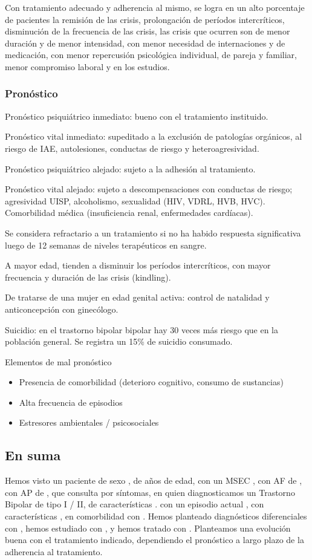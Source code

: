 Con tratamiento adecuado y adherencia al mismo, se logra en un alto porcentaje de pacientes la remisión de las crisis, prolongación de períodos intercríticos, disminución de la frecuencia de las crisis, las crisis que ocurren son de menor duración y de menor intensidad, con menor necesidad de internaciones y de medicación, con menor repercusión psicológica individual, de pareja y familiar, menor compromiso laboral y en los estudios.
\subsubsection*{Pronóstico}
Pronóstico psiquiátrico inmediato: bueno con el tratamiento instituido.

Pronóstico vital inmediato: supeditado a la exclusión de patologías orgánicos, al riesgo de IAE, autolesiones, conductas de riesgo y heteroagresividad.

Pronóstico psiquiátrico alejado: sujeto a la adhesión al tratamiento.

Pronóstico vital alejado: sujeto a descompensaciones con conductas de riesgo; agresividad UISP, alcoholismo, sexualidad (HIV, VDRL, HVB, HVC). Comorbilidad médica (insuficiencia renal, enfermedades cardíacas).

Se considera refractario a un tratamiento si no ha habido respuesta significativa luego de 12 semanas de niveles terapéuticos en sangre.

A mayor edad, tienden a disminuir los períodos intercríticos, con mayor frecuencia y duración de las crisis (kindling).

De tratarse de una mujer en edad genital activa: control de natalidad y anticoncepción con ginecólogo.

Suicidio: en el trastorno bipolar bipolar hay 30 veces más riesgo que en la población general. Se registra un 15\% de suicidio consumado.

Elementos de mal pronóstico
\begin{itemize}
	\item Presencia de comorbilidad (deterioro cognitivo, consumo de sustancias)
	\item Alta frecuencia de episodios
	\item Estresores ambientales / psicosociales
\end{itemize}
\subsection*{En suma}
Hemos visto un paciente de sexo \faQuestionCircle, de \faQuestionCircle años de edad, con un MSEC \faQuestionCircle, con AF de \faQuestionCircle, con AP de \faQuestionCircle, que consulta por \faQuestionCircle síntomas, en quien diagnosticamos un Trastorno Bipolar de tipo I / II, de características \faQuestionCircle. con un episodio actual \faQuestionCircle, con características \faQuestionCircle, en comorbilidad con \faQuestionCircle. Hemos planteado diagnósticos diferenciales con \faQuestionCircle, hemos estudiado con \faQuestionCircle, y hemos tratado con \faQuestionCircle. Planteamos una evolución buena con el tratamiento indicado, dependiendo el pronóstico a largo plazo de la adherencia al tratamiento.
